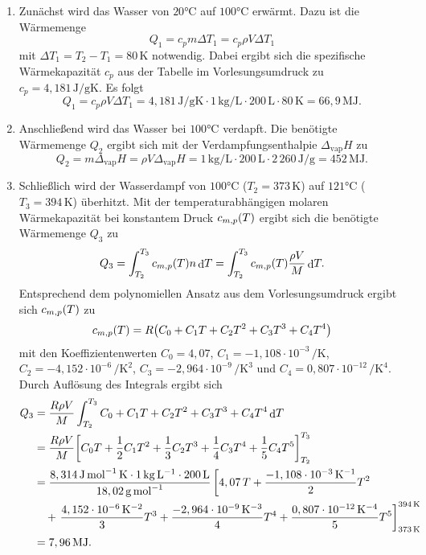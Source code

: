 \documentclass[german,12pt]{homework}
\newcommand{\dd}{\,\differ}
\DeclareMathOperator{\differ}{d}
\DeclarePairedDelimiter{\enbrace}{(}{)}
\DeclarePairedDelimiter{\benbrace}{[}{]}
\newcommand{\sis}[1]{\,\si{#1}}
\newcommand{\degC}{\si{\degreeCelsius}}
\begin{document}
    \begin{enumerate}
        \item Zunächst wird das Wasser von \(20\degC\) auf
        \(100\degC\) erwärmt. Dazu ist die Wärmemenge
        \[Q_1 = c_pm{\Delta}T_1 = c_p\rho{V}{\Delta}T_1\]
        mit \({\Delta}T_1 = T_2 - T_1 = 80\sis{\kelvin}\) notwendig. Dabei
        ergibt sich die spezifische Wärmekapazität \(c_p\) aus der Tabelle im
        Vorlesungsumdruck zu \(c_p = 4,181\sis{\joule\per\gram\kelvin}\). Es
        folgt
        \[Q_1 = c_p\rho{V}{\Delta}T_1 = 4,181\sis{\joule\per\gram\kelvin} \cdot
        1\sis{\kg\per\liter} \cdot 200\sis{\liter} \cdot 80\sis{\kelvin} =
        66,9\sis{\mega\joule}.\]
        \item Anschließend wird das Wasser bei \(100\degC\)
        verdapft. Die benötigte Wärmemenge \(Q_2\) ergibt sich mit der
        Verdampfungsenthalpie \(\Delta_\text{vap}H\) zu
        \[Q_2 = m\Delta_\text{vap}H = \rho{V}\Delta_\text{vap}H =
        1\sis{\kg\per\liter} \cdot 200\sis{\liter} \cdot
        2\,260\sis{\joule\per\gram} = 452\sis{\mega\joule}.\]
        \item Schließlich wird der Wasserdampf von \(100\degC\)
        (\(T_2 = 373\sis{\kelvin}\)) auf \(121\degC\) (\(T_3 =
        394\sis{\kelvin}\)) überhitzt. Mit der temperaturabhängigen molaren
        Wärmekapazität bei konstantem Druck \(c_{m, p}\enbrace*{T}\) ergibt
        sich die benötigte Wärmemenge \(Q_3\) zu
        \[Q_3 = \int_{T_2}^{T_3}c_{m, p}\enbrace*{T}n{\dd}T =
        \int_{T_2}^{T_3}c_{m, p}\enbrace*{T}\frac{\rho{V}}{M}{\dd}T.\]
        Entsprechend dem polynomiellen Ansatz aus dem Vorlesungsumdruck ergibt
        sich \(c_{m, p}\enbrace*{T}\) zu
        \[c_{m, p}\enbrace*{T} = R\enbrace*{C_0 + C_1T + C_2T^2 + C_3T^3 +
        C_4T^4}\]
        mit den Koeffizientenwerten \(C_0 = 4,07\), \(C_1 = -1,108 \cdot 10^{-3}
        \sis{\per\kelvin}\), \(C_2 = -4,152 \cdot 10^{-6}
        \sis{\per\kelvin\squared}\), \(C_3 = -2,964 \cdot 10^{-9}
        \sis{\per\kelvin\cubed}\) und \(C_4 = 0,807 \cdot 10^{-12}
        \sis{\per\kelvin\tothe{4}}\). Durch Auflösung des Integrals ergibt sich
        \begin{align*}
            Q_3 &= \frac{R\rho{V}}{M}\int_{T_2}^{T_3}C_0 + C_1T + C_2T^2 +
            C_3T^3 + C_4T^4{\dd}T\\
            &= \frac{R\rho{V}}{M}\benbrace*{C_0T + \frac{1}{2}C_1T^2 +
            \frac{1}{3}C_2T^3 + \frac{1}{4}C_3T^4 +
            \frac{1}{5}C_4T^5}_{T_2}^{T_3}\\
            &= \frac{8,314\sis{\joule\per\mole\kelvin} \cdot
            1\sis{\kg\per\liter} \cdot
            200\sis{\liter}}{18,02\sis{\gram\per\mole}}\left[4,07\,T + \frac{-
            1,108 \cdot 10^{-3}\sis{\per\kelvin}}{2}T^2\right.\\
            &\ \ \ + \left.\frac{4,152 \cdot 10^{-
            6}\sis{\per\kelvin\squared}}{3}T^3 + \frac{-2,964 \cdot 10^{-
            9}\sis{\per\kelvin\cubed}}{4}T^4 + \frac{0,807 \cdot 10^{-
            12}\sis{\per\kelvin\tothe{4}}}{5}T^5\right]_{373\sis{\kelvin}}^{39
            4\sis{\kelvin}}\\
            & = 7,96\sis{\mega\joule}.
        \end{align*}
    \end{enumerate}
\end{document}
